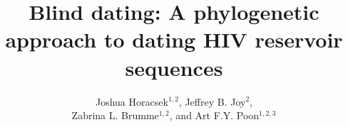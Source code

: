 \documentclass[12pt]{article}
\begin{document}
\title{Blind dating: A phylogenetic approach to dating HIV reservoir sequences}

\author{Joshua Horacsek$^{1,2}$, Jeffrey B. Joy$^2$, \\ Zabrina L. Brumme$^{1,2}$, and Art F.Y. Poon$^{1,2,3}$}
\baselineskip 22pt
\pagewiselinenumbers

\date{}
\maketitle











%
%
%
%
%


\end{document}
